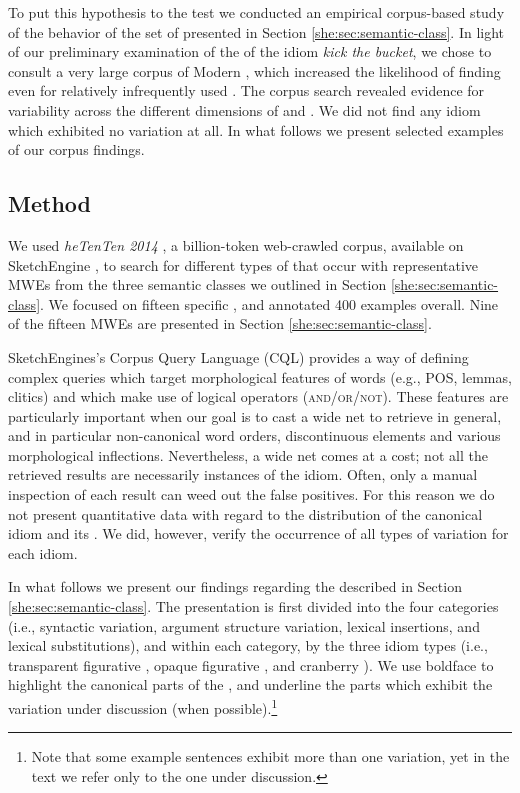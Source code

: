 \documentclass[output=paper]{langsci/langscibook}
\begin{document}
To put this hypothesis to the test we conducted an empirical corpus-based study of the behavior of the set of  presented in Section \ref{she:sec:semantic-class}. In light of our preliminary examination of the  of the idiom \textit{kick the bucket}, we chose to consult a very large corpus of Modern , which increased the likelihood of finding  even for relatively infrequently used . The corpus search revealed evidence for variability across the different dimensions of  and . We did not find any idiom which exhibited no variation at all. In what follows we present selected examples of our corpus findings.

\label{she:sec:findings}
\subsection{Method}
\label{she:sec:method}
We used \emph{heTenTen 2014} \citep{baroni-bernardini-ferraresi-zanchetta-2009}, a billion-token web-crawled  corpus, available on SketchEngine \citep{sketchengine}, to search for different types of  that occur with representative MWEs from the three semantic classes we outlined in Section \ref{she:sec:semantic-class}. We focused on fifteen specific , and annotated 400 examples overall. Nine of the fifteen MWEs are presented in Section \ref{she:sec:semantic-class}.

SketchEngines's Corpus Query Language (CQL) provides a way of defining complex queries which target morphological features of words (e.g., POS, lemmas, clitics) and which make
use of logical operators (\textsc{and\slash or\slash not}). These features are particularly important when our goal is to cast a wide net to retrieve  in general, and in particular non-canonical word orders, discontinuous elements and various morphological inflections. Nevertheless, a wide net comes at a cost; not all the retrieved results are necessarily instances of the idiom. Often, only a manual inspection of each result can weed out the false positives. For this reason we do not present quantitative data with regard to the distribution of the canonical idiom and its . We did, however, verify the occurrence of all types of variation for each idiom.

In what follows we present our findings regarding the  described in Section \ref{she:sec:semantic-class}. The presentation is first divided into the four  categories (i.e., syntactic variation, argument structure variation, lexical insertions, and lexical substitutions), and within each category, by the three idiom types (i.e., transparent figurative , opaque figurative , and cranberry ). We use boldface to highlight the canonical parts of the , and underline the parts which exhibit the variation under discussion (when possible).\footnote{Note that some example sentences exhibit more than one variation, yet in the text we refer only to the one under discussion.}
\end{document}
